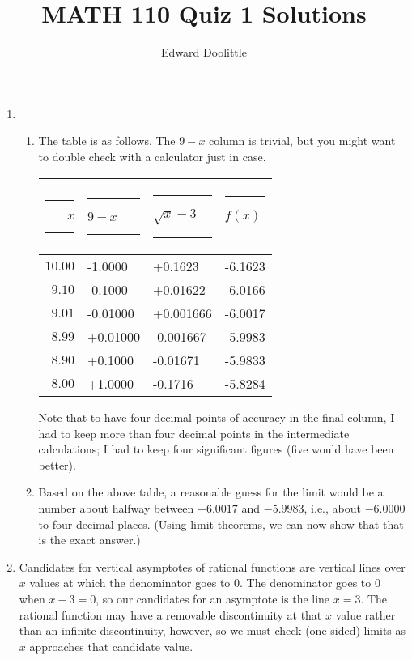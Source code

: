 \documentclass{article}
\title{MATH 110 Quiz 1 Solutions}
\author{Edward Doolittle}
\begin{document}
\maketitle
\begin{enumerate}
\item
  \begin{enumerate}
  \item The table is as follows.  The $9-x$ column is trivial,
    but you might want to double check with a calculator just in case.
    \begin{center}
      \begin{tabular}{|r|l|l|l|}
        \hline
	\rule{10pt}{0pt}$x$\rule{10pt}{0pt}     
	  & \rule{10pt}{0pt}$9-x$\rule{10pt}{0pt}
	  & \rule{10pt}{0pt}\rule{0pt}{12pt}$\sqrt{x}-3$\rule{10pt}{0pt}
	  & \rule{20pt}{0pt}$f(x)$\rule{20pt}{0pt} \\
	\hline
	\rule{0pt}{12pt}$10.00$ &   -1.0000    &+0.1623    &  -6.1623   \\
	\hline
	\rule{0pt}{12pt} $9.10$ &   -0.1000    &+0.01622   &  -6.0166   \\
	\hline
	\rule{0pt}{12pt} $9.01$ &   -0.01000   &+0.001666  &  -6.0017   \\
	\hline
	\rule{0pt}{12pt} $8.99$ &   +0.01000   &-0.001667  &  -5.9983   \\
	\hline
	\rule{0pt}{12pt} $8.90$ &   +0.1000    &-0.01671   &  -5.9833   \\
	\hline
	\rule{0pt}{12pt} $8.00$ &   +1.0000    &-0.1716    &  -5.8284   \\
	\hline
      \end{tabular}
    \end{center}
    Note that to have four decimal points of accuracy in the final column,
    I had to keep more than four decimal points in the intermediate 
    calculations; I had to keep four significant figures (five would have
    been better).
  \item %
    Based on the above table, a reasonable guess for the limit would be
    a number about halfway between $-6.0017$ and $-5.9983$, i.e., about
    $-6.0000$ to four decimal places.  (Using limit theorems, we can now
    show that that is the exact answer.)
  \end{enumerate}
\item %
  Candidates for vertical asymptotes of rational functions 
  are vertical lines over $x$ values at which the denominator goes to $0$.
  The denominator goes to $0$ when $x-3=0$, so
  our candidates for an asymptote is the line $x=3$.  The
  rational function may have a removable discontinuity at that $x$ value
  rather than an infinite discontinuity, however, so we must check (one-sided)
  limits as $x$ approaches that candidate value.  


\end{enumerate}
\end{document}
